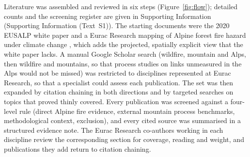 \documentclass[11pt,a4paper]{article}
\begin{document}
Literature was assembled and reviewed in six steps (Figure~\ref{fig:flow}); detailed counts and the screening register are given in Supporting Information (Supporting Information (Text~S1)). The starting documents were the 2020 EUSALP white paper \citep{muller_forest_2020} and a Eurac Research mapping of Alpine forest fire hazard under climate change \citep{gerberding_mapping_2025}, which adds the projected, spatially explicit view that the white paper lacks. A manual Google Scholar search (wildfire, mountain and Alps, then wildfire and mountains, so that process studies on links unmeasured in the Alps would not be missed) was restricted to disciplines represented at Eurac Research, so that a specialist could assess each publication. The set was then expanded by citation chaining in both directions and by targeted searches on topics that proved thinly covered. Every publication was screened against a four-level rule (direct Alpine fire evidence, external mountain process benchmarks, methodological context, exclusion), and every cited source was summarised in a structured evidence note. The Eurac Research co-authors working in each discipline review the corresponding section for coverage, reading and weight, and publications they add return to citation chaining.
\end{document}
